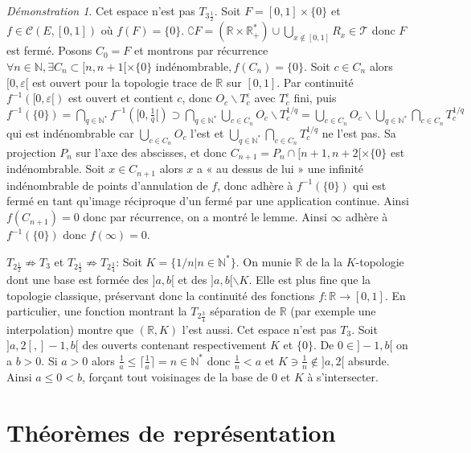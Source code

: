\documentclass[a4paper, 11pt, french]{book}
\newenvironment{itemise}{\itemize}{\enditemize}
\theoremstyle{plain} %
\theoremstyle{definition} %
\theoremstyle{remark} %
\newtheorem*{demonstration}{Démonstration}
\renewcommand{\setminus}{\backslash}
\newcommand{\1}{\mathds{1}}
\newcommand{\cont}{\mathcal{C}}
\newcommand{\infegal}{\leqslant}
\newcommand{\inv}[1]{#1^{-1}}
\newcommand{\N}{\mathbb{N}}
\newcommand{\R}{\mathbb{R}}
\begin{document}
\begin{demonstration}
\begin{itemise}
		Cet espace n'est pas $T_{3\frac{1}{2}}$.
		Soit $F=[0, 1]\times\{0\}$ et $f\in\cont(E, [0, 1])$ où $f(F)=\{0\}$.
		$\complement F=(\R\times\R_+^*)\cup\bigcup_{x\notin[0, 1]}R_x\in\mathscr{T}$ donc $F$ est fermé.
		Posons $C_0=F$ et montrons par récurrence $\forall n\in\N, \exists C_n\subset [n, n+1[\times\{0\}\text{ indénombrable}, f(C_n)=\{0\}$.
		Soit $c\in C_n$ alors $[0, \varepsilon[$ est ouvert pour la topologie trace de $\R$ sur $[0, 1]$.
		Par continuité $\inv{f}([0, \varepsilon[)$ est ouvert et contient $c$, donc $O_c\setminus T_c^\varepsilon$ avec $T_c^\varepsilon$ fini, puis $\inv{f}(\{0\})=\bigcap_{q\in\N^*}\inv{f}([0,\frac{1}{q}[)\supset\bigcap_{q\in\N^*}\bigcup_{c\in C_n}O_c\setminus T_c^{1/q}=\bigcup_{c\in C_n}O_c\setminus\bigcup_{q\in\N^*}\bigcap_{c\in C_n}T_c^{1/q}$ qui est indénombrable car $\bigcup_{c\in C_n}O_c$ l'est et $\bigcup_{q\in\N^*}\bigcap_{c\in C_n}T_c^{1/q}$ ne l'est pas.
		Sa projection $P_n$ sur l'axe des abscisses, et donc $C_{n+1}=P_n\cap[n+1, n+2[\times\{0\}$ est indénombrable.
		Soit $x\in C_{n+1}$ alors $x$ a « au dessus de lui » une infinité indénombrable de points d'annulation de $f$, donc adhère à $\inv{f}(\{0\})$ qui est fermé en tant qu'image réciproque d'un fermé par une application continue.
		Ainsi $f(C_{n+1})=0$ donc par récurrence, on a montré le lemme.
		Ainsi $\infty$ adhère à $\inv{f}(\{0\})$ donc $f(\infty)=0$.
		\item[$T_{2\frac{1}{2}}\not\Rightarrow T_3$ et $T_{2\frac{1}{2}}\not\Rightarrow T_{2\frac{3}{4}}$:]
		Soit $K=\{1/n|n\in\N^*\}$.
		On munie $\R$ de la la $K$-topologie dont une base est formée des $]a, b[$ et des $]a, b[\setminus K$.
						Elle est plus fine que la topologie classique, préservant donc la continuité des fonctions $f:\R\rightarrow[0, 1]$.
						En particulier, une fonction montrant la $T_{2\frac{3}{4}}$ séparation de $\R$ (par exemple une interpolation) montre que $(\R, K)$ l'est aussi.
						Cet espace n'est pas $T_3$.
						Soit $]a, 2[, ]-1, b[$ des ouverts contenant respectivement $K$ et $\{0\}$.
						De $0\in]-1, b[$ on a $b>0$.
						Si $a>0$ alors $\frac{1}{a}\infegal \lceil\frac{1}{a}\rceil=n\in\N^*$ donc $\frac{1}{n}<a$ et $K\ni\frac{1}{n}\notin]a, 2[$ absurde.
		Ainsi $a\infegal0<b$, forçant tout voisinages de la base de $0$ et $K$ à s'intersecter.
	\end{itemise}
\end{demonstration}

\section{Théorèmes de représentation}
\end{document}
